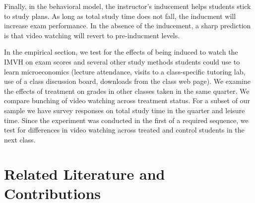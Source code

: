 \documentclass[12pt]{article}
\begin{document}
Finally, in the behavioral model, the instructor's inducement helps students stick to study plans. As long as total study time does not fall, the inducment will increase exam performance. In the absence of the inducement, a sharp prediction is that video watching will revert to pre-inducment levels.

In the empirical section, we test for the effects of being induced to watch the IMVH on exam scores and several other study methods students could use to learn microeconomics (lecture attendance, visits to a class-specific tutoring lab, use of a class discussion board, downloads from the class web page). We examine the effects of treatment on grades in other classes taken in the same quarter. We compare bunching of video watching across treatment status.  For a subset of our sample we have survey responses on total study time in the quarter and leisure time. Since the experiment was conducted in the first of a required sequence, we test for differences in video watching across treated and control students in the next class. 

\section{Related Literature and Contributions} \label{background}
\end{document}
